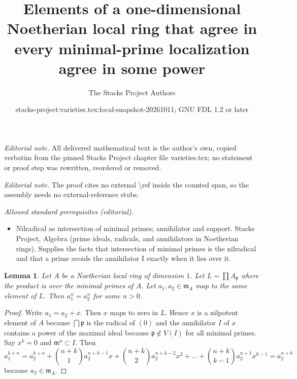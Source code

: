 \documentclass[10pt,a4paper]{amsart}
\title{Elements of a one-dimensional Noetherian local ring that agree in every minimal-prime localization agree in some power}
\author{The Stacks Project Authors}
\date{stacks-project:varieties.tex:local-snapshot-20261011; GNU FDL 1.2 or later}
\theoremstyle{plain}
\newtheorem{lemma}[subsection]{Lemma}
\theoremstyle{definition}
\theoremstyle{remark}
\numberwithin{equation}{subsection}
\begin{document}
\maketitle
\noindent\textit{Editorial note.} All delivered mathematical text is the author's own, copied verbatim from the pinned Stacks Project chapter file varieties.tex; no statement or proof step was rewritten, reordered or removed.\par\medskip
\noindent\textit{Editorial note.} The proof cites no external \textbackslash{}ref inside the counted span, so the assembly needs no external-reference stubs.\par\medskip
\noindent\textit{Allowed standard prerequisites (editorial).}\begin{itemize}
\item Nilradical as intersection of minimal primes; annihilator and support. Stacks Project, Algebra (prime ideals, radicals, and annihilators in Noetherian rings). Supplies the facts that intersection of minimal primes is the nilradical and that a prime avoids the annihilator I exactly when it lies over it.
\end{itemize}\medskip
\begin{lemma}
\label{lemma-power-equal}
Let $A$ be a Noetherian local ring of dimension $1$.
Let $L = \prod A_\mathfrak p$ where the product is over
the minimal primes of $A$. Let $a_1, a_2 \in \mathfrak m_A$
map to the same element of $L$. Then $a_1^n = a_2^n$ for
some $n > 0$.
\end{lemma}

\begin{proof}
Write $a_1 = a_2 + x$. Then $x$ maps to zero in $L$. Hence
$x$ is a nilpotent element of $A$ because $\bigcap \mathfrak p$
is the radical of $(0)$ and the annihilator $I$ of $x$ contains
a power of the maximal ideal because $\mathfrak p \not \in V(I)$
for all minimal primes. Say $x^k = 0$ and $\mathfrak m^n \subset I$.
Then
$$
a_1^{k + n} = a_2^{k + n} + {n + k \choose 1} a_2^{n + k - 1} x +
{n + k \choose 2} a_2^{n + k - 2} x^2 + \ldots +
{n + k \choose k - 1} a_2^{n + 1} x^{k - 1} = a_2^{n + k}
$$
because $a_2 \in \mathfrak m_A$.
\end{proof}
\end{document}
